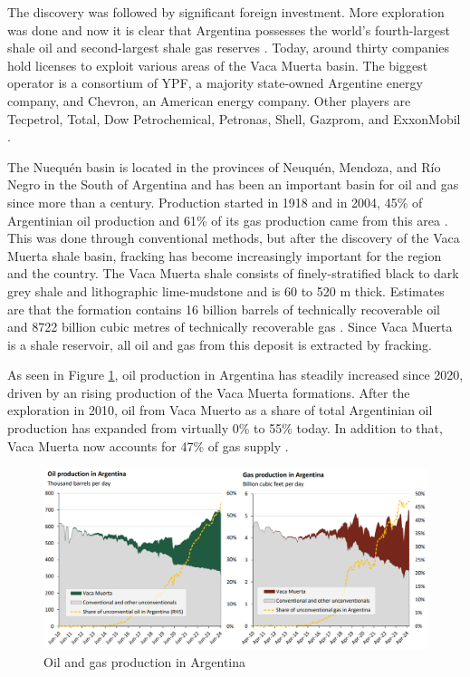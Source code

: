 The discovery was followed by significant foreign investment. More exploration was done and now it is clear that Argentina possesses the world’s fourth-largest shale oil and second-largest shale gas reserves \autocite{internationaltradeadministrationArgentinaCountryCommercial2025}. Today, around thirty companies hold licenses to exploit various areas of the Vaca Muerta basin. The biggest operator is a consortium of YPF, a majority state-owned Argentine energy company, and Chevron, an American energy company. Other players are Tecpetrol, Total, Dow Petrochemical, Petronas, Shell, Gazprom, and ExxonMobil \autocite{fogliaSedArena2023}.

The Nuequén basin is located in the provinces of Neuquén, Mendoza, and Río Negro in the South of Argentina and has been an important basin for oil and gas since more than a century. Production started in 1918 and in 2004, 45\% of Argentinian oil production and 61\% of its gas production came from this area \autocite{u.s.energyinformationadministrationTechnicallyRecoverableShale2013}. This was done through conventional methods, but after the discovery of the Vaca Muerta shale basin, fracking has become increasingly important for the region and the country. The Vaca Muerta shale consists of finely-stratified black to dark grey shale and lithographic lime-mudstone and is 60 to 520 m thick. Estimates are that the formation contains 16 billion barrels of technically recoverable oil and 8722 billion cubic metres of technically recoverable gas \autocite{u.s.energyinformationadministrationTechnicallyRecoverableShale2013}. Since Vaca Muerta is a shale reservoir, all oil and gas from this deposit is extracted by fracking.

As seen in Figure \ref{fig:oilgasprod}, oil production in Argentina has steadily increased since 2020, driven by an rising production of the Vaca Muerta formations. After the exploration in 2010, oil from Vaca Muerto as a share of total Argentinian oil production has expanded from virtually 0\% to 55\% today. In addition to that, Vaca Muerta now accounts for 47\% of gas supply \autocite{internationaltradeadministrationArgentinaCountryCommercial2025}.

\begin{figure}[H]
    \centering
    \includegraphics[width=1\linewidth]{figures/ch9/oilgasproduction.png}
    \caption{Oil and gas production in Argentina \autocite{internationaltradeadministrationArgentinaCountryCommercial2025}}
    \label{fig:oilgasprod}
\end{figure}

